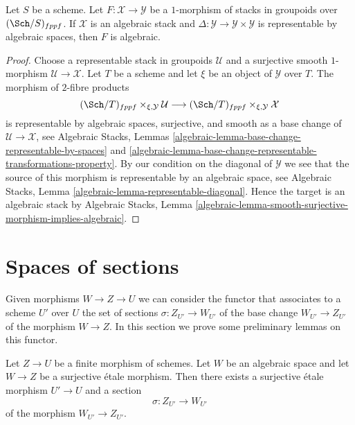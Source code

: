 \begin{lemma}
\label{lemma-map-from-algebraic}
Let $S$ be a scheme. Let $F : \mathcal{X} \to \mathcal{Y}$ be a $1$-morphism
of stacks in groupoids over $(\Sch/S)_{fppf}$. If $\mathcal{X}$ is an
algebraic stack and $\Delta : \mathcal{Y} \to \mathcal{Y} \times \mathcal{Y}$
is representable by algebraic spaces, then $F$ is algebraic.
\end{lemma}

\begin{proof}
Choose a representable stack in groupoids $\mathcal{U}$ and a surjective
smooth $1$-morphism $\mathcal{U} \to \mathcal{X}$. Let $T$ be a scheme and
let $\xi$ be an object of $\mathcal{Y}$ over $T$. The morphism of
$2$-fibre products
$$
(\Sch/T)_{fppf} \times_{\xi, \mathcal{Y}} \mathcal{U}
\longrightarrow
(\Sch/T)_{fppf} \times_{\xi, \mathcal{Y}} \mathcal{X}
$$
is representable by algebraic spaces, surjective, and smooth as a
base change of $\mathcal{U} \to \mathcal{X}$, see
Algebraic Stacks,
Lemmas \ref{algebraic-lemma-base-change-representable-by-spaces} and
\ref{algebraic-lemma-base-change-representable-transformations-property}.
By our condition on the diagonal of $\mathcal{Y}$ we see that
the source of this morphism is representable by an algebraic space, see
Algebraic Stacks, Lemma \ref{algebraic-lemma-representable-diagonal}.
Hence the target is an algebraic stack by
Algebraic Stacks,
Lemma \ref{algebraic-lemma-smooth-surjective-morphism-implies-algebraic}.
\end{proof}
















\section{Spaces of sections}
\label{section-spaces-sections}

\noindent
Given morphisms $W \to Z \to U$ we can consider the functor that associates
to a scheme $U'$ over $U$ the set of sections $\sigma : Z_{U'} \to W_{U'}$
of the base change $W_{U'} \to Z_{U'}$ of the morphism $W \to Z$.
In this section we prove some preliminary lemmas on this functor.

\begin{lemma}
\label{lemma-surjection-space-of-sections}
Let $Z \to U$ be a finite morphism of schemes.
Let $W$ be an algebraic space and let $W \to Z$ be a
surjective \'etale morphism. Then there exists a surjective
\'etale morphism $U' \to U$ and a section
$$
\sigma : Z_{U'} \to W_{U'}
$$
of the morphism $W_{U'} \to Z_{U'}$.
\end{lemma}

